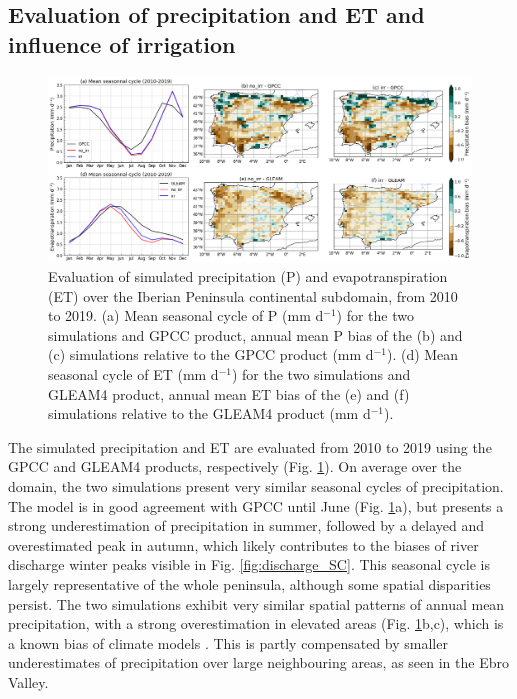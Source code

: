 \clearpage

\subsection{Evaluation of precipitation and ET and influence of irrigation}

\begin{figure}[htbp]
    \centering
    \includegraphics[width=\textwidth]{images/chap4/article/f06.png}
    \caption{Evaluation of simulated precipitation (P) and evapotranspiration (ET) over the Iberian Peninsula continental subdomain, from 2010 to 2019. 
    (a) Mean seasonal cycle of P (mm d$^{-1}$) for the two simulations and GPCC product, annual mean P bias of the (b) \noirr and (c) \irr simulations relative to the GPCC product (mm d$^{-1}$).
    (d) Mean seasonal cycle of ET (mm d$^{-1}$) for the two simulations and GLEAM4 product, annual mean ET bias of the (e) \noirr and (f) \irr simulations relative to the GLEAM4 product (mm d$^{-1}$).}
    \label{fig:sim_eval_ET_P}
\end{figure}

The simulated precipitation and ET are evaluated from 2010 to 2019 using the GPCC and GLEAM4 products, respectively (Fig. \ref{fig:sim_eval_ET_P}).
On average over the domain, the two simulations present very similar seasonal cycles of precipitation. The model is in good agreement with GPCC until June (Fig. \ref{fig:sim_eval_ET_P}a), but presents a strong underestimation of precipitation in summer, followed by a delayed and overestimated peak in autumn, which likely contributes to the biases of river discharge winter peaks visible in Fig. \ref{fig:discharge_SC}. 
This seasonal cycle is largely representative of the whole peninsula, although some spatial disparities persist. The two simulations exhibit very similar spatial patterns of annual mean precipitation, with a strong overestimation in elevated areas (Fig. \ref{fig:sim_eval_ET_P}b,c), which is a known bias of climate models \citep{arjdal_modeling_2024, adhikari_evaluation_2024}.
This is partly compensated by smaller underestimates of precipitation over large neighbouring areas, as seen in the Ebro Valley.

